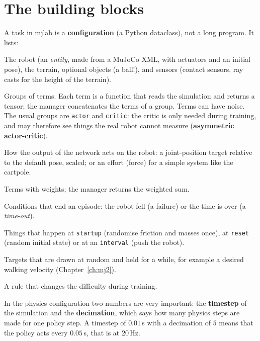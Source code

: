 \section*{The building blocks}
A task in mjlab is a \textbf{configuration} (a Python dataclass), not a long program. It lists:
\begin{description}[leftmargin=0.6cm]
 \item[Scene and entities.] The robot (an \emph{entity}, made from a MuJoCo XML, with actuators and an initial pose), the terrain, optional objects (a ball!), and sensors (contact sensors, ray casts for the height of the terrain).
 \item[Observations.] Groups of terms. Each term is a function that reads the simulation and returns a tensor; the manager concatenates the terms of a group. Terms can have noise. The usual groups are \texttt{actor} and \texttt{critic}: the critic is only needed during training, and may therefore see things the real robot cannot measure (\textbf{asymmetric actor-critic}).
 \item[Actions.] How the output of the network acts on the robot: a joint-position target relative to the default pose, scaled; or an effort (force) for a simple system like the cartpole.
 \item[Rewards.] Terms with weights; the manager returns the weighted sum.
 \item[Terminations.] Conditions that end an episode: the robot fell (a failure) or the time is over (a \emph{time-out}).
 \item[Events.] Things that happen at \texttt{startup} (randomise friction and masses once), at \texttt{reset} (random initial state) or at an \texttt{interval} (push the robot).
 \item[Commands.] Targets that are drawn at random and held for a while, for example a desired walking velocity (Chapter~\ref{ch:mj2}).
 \item[Curriculum.] A rule that changes the difficulty during training.
\end{description}
In the physics configuration two numbers are very important: the \textbf{timestep} of the simulation and the \textbf{decimation}, which says how many physics steps are made for one policy step. A timestep of $0.01$\,s with a decimation of $5$ means that the policy acts every $0.05$\,s, that is at $20$\,Hz.

